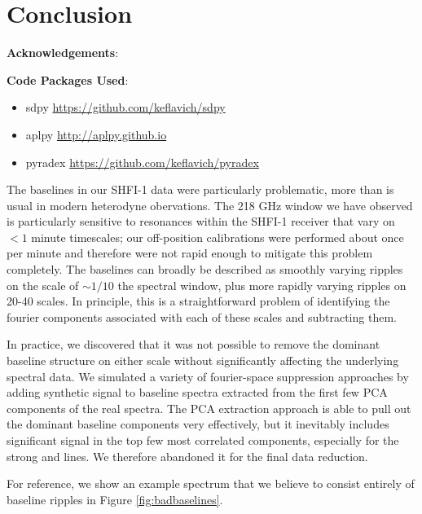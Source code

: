 \section{Conclusion}


\textbf{Acknowledgements}:

\textbf{Code Packages Used}:

\begin{itemize}
    \item sdpy \url{https://github.com/keflavich/sdpy}
    \item aplpy \url{http://aplpy.github.io}
    \item pyradex \url{https://github.com/keflavich/pyradex}
\end{itemize}

The baselines in our SHFI-1 data were particularly problematic, more than is
usual in modern heterodyne obervations.  The 218 GHz window we have observed is
particularly sensitive to resonances within the SHFI-1 receiver that vary on
$<1$ minute timescales; our off-position calibrations were performed about once
per minute and therefore were not rapid enough to mitigate this problem
completely.  The baselines can broadly be described as smoothly varying ripples
on the scale of $\sim1/10$ the spectral window, plus more rapidly varying
ripples on 20-40 \kms scales.  In principle, this is a straightforward problem
of identifying the fourier components associated with each of these scales and
subtracting them.

In practice, we discovered that it was not possible to remove the dominant
baseline structure on either scale without significantly affecting the
underlying spectral data.  We simulated a variety of fourier-space suppression
approaches by adding synthetic signal to baseline spectra extracted from the
first few PCA components of the real spectra.
The PCA extraction approach is able to pull out the dominant baseline
components very effectively, but it inevitably includes significant signal in
the top few most correlated components, especially for the strong \formaldehyde
and \thirteenco lines.  We therefore abandoned it for the final data reduction.

For reference, we show an example spectrum that we believe to consist entirely
of baseline ripples in Figure \ref{fig:badbaselines}.

